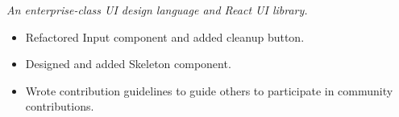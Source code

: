 \documentclass{software_engineer_rustin_liu}
\newcommand{\en}[1]{#1}
\newcommand{\zh}[1]{}
\begin{document}
\en{}
\zh{\datedsubsection{\textbf{ant-design - 前维护者}}{{\href{https://github.com/ant-design/ant-design/commits?author=hi-rustin}{24+ commits}}}}
\en{\textsl{An enterprise-class UI design language and React UI library.}}
\zh{\textsl{企业级 UI 设计语言和 React UI 库。}}

\begin{itemize}
      \item \en{Refactored Input component and added cleanup button.}
            \zh{重构了 Input 组件，添加清理按钮。}
      \item \en{Designed and added Skeleton component.}
            \zh{设计并添加了 Skeleton 组件。}
      \item \en{Wrote contribution guidelines to guide others to participate in community contributions.}
            \zh{编写了贡献指南，引导其他人参与社区贡献。}
\end{itemize}
\end{document}
